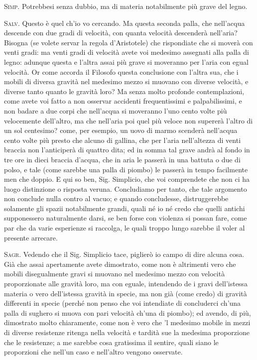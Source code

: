 \documentclass[11pt,twoside,openany]{book}
\newcommand{\speaker}[1]{\textcolor{rubric}{\textsc{#1}}\space}
\begin{document}
\speaker{Simp.} Potrebbesi senza dubbio, ma di materia notabilmente più grave del legno.

\speaker{Salv.} Questo è quel ch'io vo cercando. Ma questa seconda palla, che nell'acqua descende con due gradi di velocità, con quanta velocità descenderà nell'aria? Bisogna (se volete servar la regola d'Aristotele) che rispondiate che si moverà con venti gradi: ma venti gradi di velocità avete voi medesimo assegnati alla palla di legno: adunque questa e l'altra assai più grave si moveranno per l'aria con egual velocità. Or come accorda il Filosofo questa conclusione con l'altra sua, che i mobili di diversa gravità nel medesimo mezzo si muovano con diverse velocità, e diverse tanto quanto le gravità loro? Ma senza molto profonde contemplazioni, come avete voi fatto a non osservar accidenti frequentissimi e palpabilissimi, e non badare a due corpi che nell'acqua si moveranno l'uno cento volte più velocemente dell'altro, ma che nell'aria poi quel più veloce non supererà l'altro di un sol centesimo? come, per esempio, un uovo di marmo scenderà nell'acqua cento volte più presto che alcuno di gallina, che per l'aria nell'altezza di venti braccia non l'anticiperà di quattro dita; ed in somma tal grave andrà al fondo in tre ore in dieci braccia d'acqua, che in aria le passerà in una battuta o due di polso, e tale (come sarebbe una palla di piombo) le passerà in tempo facilmente men che doppio. E qui so ben, Sig. Simplicio, che voi comprendete che non ci ha luogo distinzione o risposta veruna. Concludiamo per tanto, che tale argomento non conclude nulla contro al vacuo; e quando concludesse, distruggerebbe solamente gli spazii notabilmente grandi, quali né io né credo che quelli antichi supponessero naturalmente darsi, se ben forse con violenza si possan fare, come par che da varie esperienze si raccolga, le quali troppo lungo sarebbe il voler al presente arrecare.

\speaker{Sagr.} Vedendo che il Sig. Simplicio tace, piglierò io campo di dire alcuna cosa. Già che assai apertamente avete dimostrato, come non è altrimenti vero che mobili disegualmente gravi si muovano nel medesimo mezzo con velocità proporzionate alle gravità loro, ma con eguale, intendendo de i gravi dell'istessa materia o vero dell'istessa gravità in specie, ma non già (come credo) di gravità differenti in specie (perché non penso che voi intendiate di concluderci ch'una palla di sughero si muova con pari velocità ch'una di piombo); ed avendo, di più, dimostrato molto chiaramente, come non è vero che 'l medesimo mobile in mezzi di diverse resistenze ritenga nella velocità e tardità sue la medesima proporzione che le resistenze; a me sarebbe cosa gratissima il sentire, quali siano le proporzioni che nell'un caso e nell'altro vengono osservate.
\end{document}
